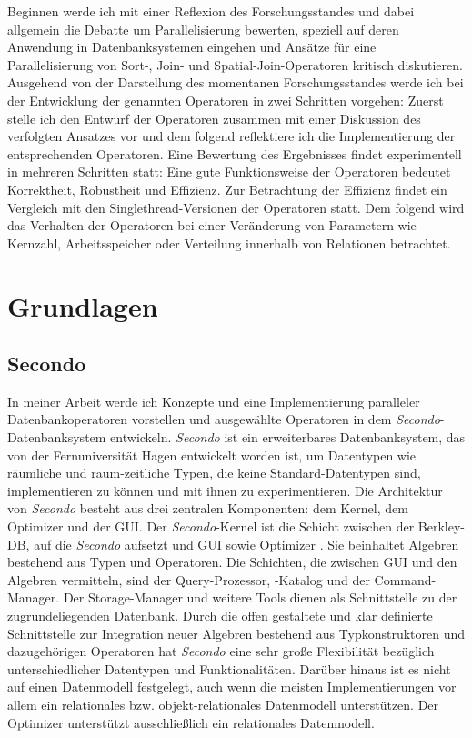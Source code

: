 \documentclass[a4paper,12pt,twoside]{article}
\newcommand{\Fb}[1]{\textit{#1}} %
\begin{document}
Beginnen werde ich mit einer Reflexion des Forschungsstandes und dabei allgemein die Debatte um Parallelisierung bewerten, speziell auf deren Anwendung in Datenbanksystemen eingehen und Ansätze für eine Parallelisierung von Sort-, Join- und Spatial-Join-Operatoren kritisch diskutieren. Ausgehend von der Darstellung des momentanen Forschungsstandes werde ich bei der Entwicklung der genannten Operatoren in zwei Schritten vorgehen: Zuerst stelle ich den Entwurf der Operatoren zusammen mit einer Diskussion des verfolgten Ansatzes vor und dem folgend reflektiere ich die Implementierung der entsprechenden Operatoren. Eine Bewertung des Ergebnisses findet experimentell in mehreren Schritten statt: Eine gute Funktionsweise der Operatoren bedeutet Korrektheit, Robustheit und Effizienz. Zur Betrachtung der Effizienz findet ein Vergleich mit den Singlethread-Versionen der Operatoren statt. Dem folgend wird das Verhalten der Operatoren bei einer Veränderung von Parametern wie Kernzahl, Arbeitsspeicher oder Verteilung innerhalb von Relationen betrachtet.

\section{Grundlagen}

\subsection{Secondo}

In meiner Arbeit werde ich Konzepte und eine Implementierung paralleler Datenbankoperatoren vorstellen und ausgewählte Operatoren in dem \Fb{Secondo}-Datenbanksystem entwickeln. \Fb{Secondo} \parencite{Gueting2010} ist ein erweiterbares Datenbanksystem, das von der Fernuniversität Hagen entwickelt worden ist, um Datentypen wie räumliche und raum-zeitliche Typen, die keine Standard-Datentypen sind, implementieren zu können und mit ihnen zu experimentieren. Die Architektur von \Fb{Secondo} besteht aus drei zentralen Komponenten: dem Kernel, dem Optimizer und der GUI. Der \Fb{Secondo}-Kernel ist die Schicht zwischen der Berkley-DB, auf die \Fb{Secondo} aufsetzt und GUI sowie Optimizer \parencite{Gueting2017}. Sie beinhaltet Algebren bestehend aus Typen und Operatoren. Die Schichten, die zwischen GUI und den Algebren vermitteln, sind der Query-Prozessor, -Katalog und der Command-Manager. Der Storage-Manager und weitere Tools dienen als Schnittstelle zu der zugrundeliegenden Datenbank. Durch die offen gestaltete und klar definierte Schnittstelle zur Integration neuer Algebren bestehend aus Typkonstruktoren und dazugehörigen Operatoren hat \Fb{Secondo} eine sehr große Flexibilität bezüglich unterschiedlicher Datentypen und Funktionalitäten. Darüber hinaus ist es nicht auf einen Datenmodell festgelegt, auch wenn die meisten Implementierungen vor allem ein relationales bzw. objekt-relationales Datenmodell unterstützen. Der Optimizer unterstützt ausschließlich ein relationales Datenmodell. 
\end{document}

